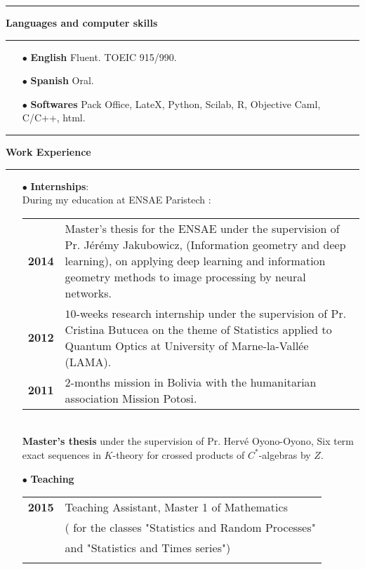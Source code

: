 \documentclass[a4paper,11pt]{article}
\newcommand\espace{\vrule height 20pt width 0pt}
\newcommand{\titre}[1]{%
	\begin{center}
	\bigskip
	\rule{\textwidth}{1pt}
	\par\vspace{0.1cm}
        \textbf{\large #1}
	\par\rule{\textwidth}{1pt}
	\end{center}
	\bigskip
	}
\begin{document}
\titre{Languages and computer skills}


\begin{itemize} 
\medskip
\item[$\bullet$] \textbf{English} Fluent. TOEIC 915/990.
\medskip
\item[$\bullet$] \textbf{Spanish} Oral.
\medskip
\item[$\bullet$] \textbf{Softwares} Pack Office, LateX, Python, Scilab, R, Objective Caml, C/C++, html.

\end{itemize}

\titre{Work Experience}
\begin{itemize}
\medskip
\item[$\bullet$] \textbf{Internships}: \\

During my education at ENSAE Paristech : \\

\begin{tabular}{cp{}}
\textbf{2014} & Master's thesis for the ENSAE under the supervision of Pr. Jérémy Jakubowicz, (Information geometry and deep learning), on applying deep learning and information geometry methods to image processing by neural networks.\\
\textbf{2012}&  $10$-weeks research internship under the supervision of Pr. Cristina Butucea on the theme of Statistics applied to Quantum Optics at University of Marne-la-Vallée (LAMA).		\\
\textbf{2011} & $2$-months mission in Bolivia with the humanitarian association Mission Potosi.\\
\end{tabular}
\\

\textbf{Master's thesis} under the supervision of Pr. Hervé Oyono-Oyono, Six term exact sequences in $K$-theory for crossed products of $C^*$-algebras by $Z$.

\medskip

\item[$\bullet$] \textbf{Teaching} \\

\begin{tabular}{lp{}}

\textbf{2015} &  Teaching Assistant, Master 1 of Mathematics \\
			& ( for the classes "Statistics and Random Processes" \\
		& and "Statistics and Times series")\\
\espace


\end{tabular}
\end{itemize}
\end{document}
